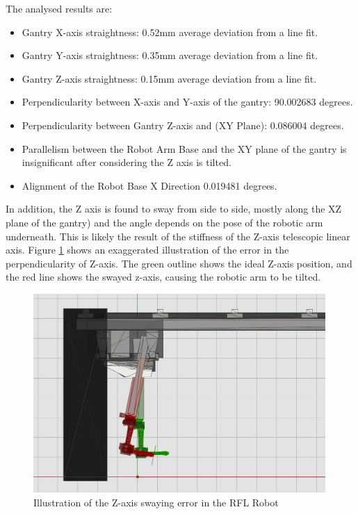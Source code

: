 The analysed results are:

\begin{itemize}
	\item Gantry X-axis straightness: 0.52mm average deviation from a line fit.

	\item Gantry Y-axis straightness: 0.35mm average deviation from a line fit.

	\item Gantry Z-axis straightness: 0.15mm average deviation from a line fit.

	\item Perpendicularity between X-axis and Y-axis of the gantry: 90.002683 degrees.

	\item Perpendicularity between Gantry Z-axis and (XY Plane): 0.086004 degrees.

	\item Parallelism between the Robot Arm Base and the XY plane of the gantry is insignificant after considering the Z axis is tilted.

	\item Alignment of the Robot Base X Direction 0.019481 degrees.

\end{itemize}
In addition, the Z axis is found to sway from side to side, mostly along the XZ plane of the gantry) and the angle depends on the pose of the robotic arm underneath. This is likely the result of the stiffness of the Z-axis telescopic linear axis. Figure \ref{fig:z-axis-swaying-error} shows an exaggerated illustration of the error in the perpendicularity of Z-axis. The green outline shows the ideal Z-axis position, and the red line shows the swayed z-axis, causing the robotic arm to be tilted.

\begin{figure}[!h]
    \centering
    \includegraphics[width=0.99\textwidth]{images/6b/img22.jpg}
    \caption{Illustration of the Z-axis swaying error in the RFL Robot}
    \label{fig:z-axis-swaying-error}
\end{figure}

